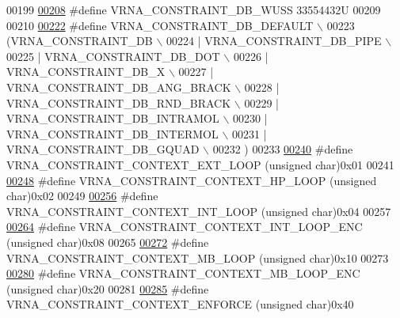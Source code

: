 \begin{DoxyCode}
00199 
\hyperlink{group__hard__constraints_ga10ce6bd2355945f3c8161b7a30a2c322}{00208} \textcolor{preprocessor}{#define VRNA\_CONSTRAINT\_DB\_WUSS                 33554432U}
00209 
00210 
\hyperlink{group__hard__constraints_ga1c3864bdc92147a4d93de2b1b4356177}{00222} \textcolor{preprocessor}{#define VRNA\_CONSTRAINT\_DB\_DEFAULT \(\backslash\)}
00223 \textcolor{preprocessor}{  (VRNA\_CONSTRAINT\_DB \(\backslash\)}
00224 \textcolor{preprocessor}{   | VRNA\_CONSTRAINT\_DB\_PIPE \(\backslash\)}
00225 \textcolor{preprocessor}{   | VRNA\_CONSTRAINT\_DB\_DOT \(\backslash\)}
00226 \textcolor{preprocessor}{   | VRNA\_CONSTRAINT\_DB\_X \(\backslash\)}
00227 \textcolor{preprocessor}{   | VRNA\_CONSTRAINT\_DB\_ANG\_BRACK \(\backslash\)}
00228 \textcolor{preprocessor}{   | VRNA\_CONSTRAINT\_DB\_RND\_BRACK \(\backslash\)}
00229 \textcolor{preprocessor}{   | VRNA\_CONSTRAINT\_DB\_INTRAMOL \(\backslash\)}
00230 \textcolor{preprocessor}{   | VRNA\_CONSTRAINT\_DB\_INTERMOL \(\backslash\)}
00231 \textcolor{preprocessor}{   | VRNA\_CONSTRAINT\_DB\_GQUAD \(\backslash\)}
00232 \textcolor{preprocessor}{  )}
00233 
\hyperlink{group__hard__constraints_ga9418eda62a5dec070896702c279d2548}{00240} \textcolor{preprocessor}{#define VRNA\_CONSTRAINT\_CONTEXT\_EXT\_LOOP      (unsigned char)0x01}
00241 
\hyperlink{group__hard__constraints_ga79203702b197b6b9d3b78eed40663eb1}{00248} \textcolor{preprocessor}{#define VRNA\_CONSTRAINT\_CONTEXT\_HP\_LOOP       (unsigned char)0x02}
00249 
\hyperlink{group__hard__constraints_ga21feeab3a9e5fa5a9e3d9ac0fcf5994f}{00256} \textcolor{preprocessor}{#define VRNA\_CONSTRAINT\_CONTEXT\_INT\_LOOP      (unsigned char)0x04}
00257 
\hyperlink{group__hard__constraints_ga0536288e04ff6332ecdc23ca4705402b}{00264} \textcolor{preprocessor}{#define VRNA\_CONSTRAINT\_CONTEXT\_INT\_LOOP\_ENC  (unsigned char)0x08}
00265 
\hyperlink{group__hard__constraints_ga456ecd2ff00056bb64da8dd4f61bbfc5}{00272} \textcolor{preprocessor}{#define VRNA\_CONSTRAINT\_CONTEXT\_MB\_LOOP       (unsigned char)0x10}
00273 
\hyperlink{group__hard__constraints_ga02a3d703ddbcfce393e4bbfcb9db7077}{00280} \textcolor{preprocessor}{#define VRNA\_CONSTRAINT\_CONTEXT\_MB\_LOOP\_ENC   (unsigned char)0x20}
00281 
\hyperlink{hard_8h_a1aa55f2c6347e670e003b1a765632dad}{00285} \textcolor{preprocessor}{#define VRNA\_CONSTRAINT\_CONTEXT\_ENFORCE       (unsigned char)0x40}

\end{DoxyCode}
